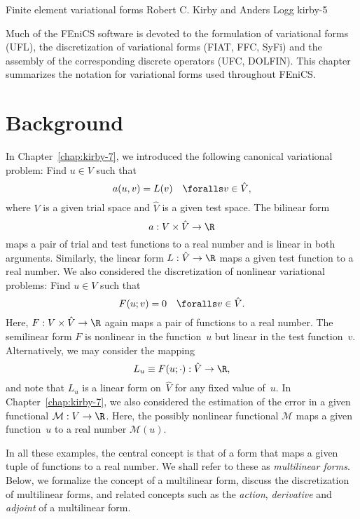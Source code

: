               {Finite element variational forms}
              {Robert C. Kirby and Anders Logg}
              {kirby-5}

Much of the FEniCS software is devoted to the formulation of
variational forms (UFL), the discretization of variational forms
(FIAT, FFC, SyFi) and the assembly of the corresponding discrete
operators (UFC, DOLFIN). This chapter summarizes the notation for
variational forms used throughout FEniCS.

\section{Background}

In Chapter~\ref{chap:kirby-7}, we introduced the following canonical
variational problem: Find $u \in V$ such that
\begin{equation} \label{eq:kirby-5:canonical}
  a(u, v) = L(v) \quad \foralls v \in \hat{V},
\end{equation}
where $V$ is a given trial space and $\hat{V}$ is a given test space.
The bilinear form
\begin{equation}
  a: V \times \hat{V} \rightarrow \R
\end{equation}
maps a pair of trial and test functions to a real number and is linear
in both arguments. Similarly, the linear form $L: \hat{V} \rightarrow
\R$ maps a given test function to a real number. We also considered
the discretization of nonlinear variational problems: Find $u \in V$
such that
\begin{equation}
  F(u; v) = 0 \quad \foralls v \in \hat{V}.
\end{equation}
Here, $F: V \times \hat{V} \rightarrow \R$ again maps a pair of
functions to a real number. The semilinear form $F$ is nonlinear in
the function~$u$ but linear in the test function~$v$. Alternatively,
we may consider the mapping
\begin{equation}
  L_u \equiv F(u; \cdot) : \hat{V} \rightarrow \R,
\end{equation}
and note that $L_u$ is a linear form on~$\hat{V}$ for any fixed value
of~$u$. In Chapter~\ref{chap:kirby-7}, we also considered the
estimation of the error in a given functional $\mathcal{M} : V
\rightarrow \R$. Here, the possibly nonlinear functional $\mathcal{M}$
maps a given function~$u$ to a real number $\mathcal{M}(u)$.

In all these examples, the central concept is that of a form that maps
a given tuple of functions to a real number. We shall refer to these
as \emph{multilinear forms}. Below, we formalize the concept of a
multilinear form, discuss the discretization of multilinear forms, and
related concepts such as the \emph{action}, \emph{derivative} and
\emph{adjoint} of a multilinear form.

